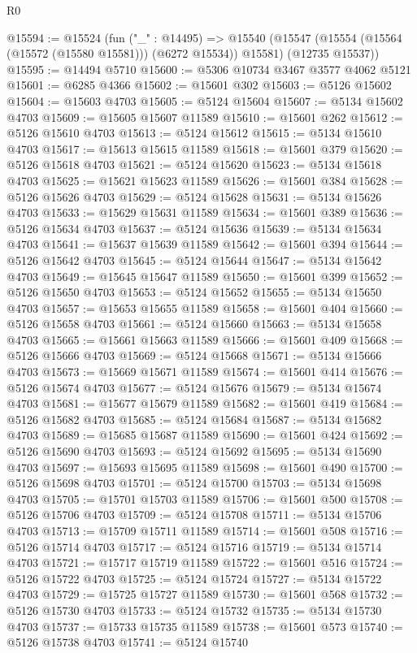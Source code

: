 \begin{lexlean}{R0}
\begin{coremodule}
@15594 := @15524
    (fun ("_" : @14495) =>
    @15540
      (@15547 (@15554 (@15564 (@15572 (@15580 @15581))) (@6272 @15534)) @15581)
      (@12735 @15537))
@15595 := @14494 @5710
@15600 := @5306 @10734 @3467 @3577 @4062 @5121
@15601 := @6285 @4366
@15602 := @15601 @302
@15603 := @5126 @15602
@15604 := @15603 @4703
@15605 := @5124 @15604
@15607 := @5134 @15602 @4703
@15609 := @15605 @15607 @11589
@15610 := @15601 @262
@15612 := @5126 @15610 @4703
@15613 := @5124 @15612
@15615 := @5134 @15610 @4703
@15617 := @15613 @15615 @11589
@15618 := @15601 @379
@15620 := @5126 @15618 @4703
@15621 := @5124 @15620
@15623 := @5134 @15618 @4703
@15625 := @15621 @15623 @11589
@15626 := @15601 @384
@15628 := @5126 @15626 @4703
@15629 := @5124 @15628
@15631 := @5134 @15626 @4703
@15633 := @15629 @15631 @11589
@15634 := @15601 @389
@15636 := @5126 @15634 @4703
@15637 := @5124 @15636
@15639 := @5134 @15634 @4703
@15641 := @15637 @15639 @11589
@15642 := @15601 @394
@15644 := @5126 @15642 @4703
@15645 := @5124 @15644
@15647 := @5134 @15642 @4703
@15649 := @15645 @15647 @11589
@15650 := @15601 @399
@15652 := @5126 @15650 @4703
@15653 := @5124 @15652
@15655 := @5134 @15650 @4703
@15657 := @15653 @15655 @11589
@15658 := @15601 @404
@15660 := @5126 @15658 @4703
@15661 := @5124 @15660
@15663 := @5134 @15658 @4703
@15665 := @15661 @15663 @11589
@15666 := @15601 @409
@15668 := @5126 @15666 @4703
@15669 := @5124 @15668
@15671 := @5134 @15666 @4703
@15673 := @15669 @15671 @11589
@15674 := @15601 @414
@15676 := @5126 @15674 @4703
@15677 := @5124 @15676
@15679 := @5134 @15674 @4703
@15681 := @15677 @15679 @11589
@15682 := @15601 @419
@15684 := @5126 @15682 @4703
@15685 := @5124 @15684
@15687 := @5134 @15682 @4703
@15689 := @15685 @15687 @11589
@15690 := @15601 @424
@15692 := @5126 @15690 @4703
@15693 := @5124 @15692
@15695 := @5134 @15690 @4703
@15697 := @15693 @15695 @11589
@15698 := @15601 @490
@15700 := @5126 @15698 @4703
@15701 := @5124 @15700
@15703 := @5134 @15698 @4703
@15705 := @15701 @15703 @11589
@15706 := @15601 @500
@15708 := @5126 @15706 @4703
@15709 := @5124 @15708
@15711 := @5134 @15706 @4703
@15713 := @15709 @15711 @11589
@15714 := @15601 @508
@15716 := @5126 @15714 @4703
@15717 := @5124 @15716
@15719 := @5134 @15714 @4703
@15721 := @15717 @15719 @11589
@15722 := @15601 @516
@15724 := @5126 @15722 @4703
@15725 := @5124 @15724
@15727 := @5134 @15722 @4703
@15729 := @15725 @15727 @11589
@15730 := @15601 @568
@15732 := @5126 @15730 @4703
@15733 := @5124 @15732
@15735 := @5134 @15730 @4703
@15737 := @15733 @15735 @11589
@15738 := @15601 @573
@15740 := @5126 @15738 @4703
@15741 := @5124 @15740

\end{coremodule}
\end{lexlean}
